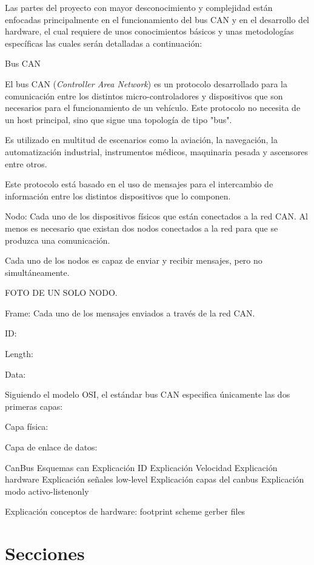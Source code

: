 
Las partes del proyecto con mayor desconocimiento y complejidad están enfocadas principalmente en el funcionamiento del bus CAN y en el desarrollo del hardware, el cual requiere de unos conocimientos básicos y unas metodologías específicas las cuales serán detalladas a continuación:

Bus CAN

El bus CAN (\emph{Controller Area Network}) es un protocolo desarrollado para la comunicación entre los distintos micro-controladores y dispositivos que son necesarios para el funcionamiento de un vehículo. Este protocolo no necesita de un host principal, sino que sigue una topología de tipo "bus".

Es utilizado en multitud de escenarios como la aviación, la navegación, la automatización industrial, instrumentos médicos, maquinaria pesada y ascensores entre otros.

Este protocolo está basado en el uso de mensajes para el intercambio de información entre los distintos dispositivos que lo componen.

Nodo:
Cada uno de los dispositivos físicos que están conectados a la red CAN. Al menos es necesario que existan dos nodos conectados a la red para que se produzca una comunicación.


Cada uno de los nodos es capaz de enviar y recibir mensajes, pero no simultáneamente. 

FOTO DE UN SOLO NODO.

Frame:
Cada uno de los mensajes enviados a través de la red CAN. 

ID:

Length:

Data:



Siguiendo el modelo OSI, el estándar bus CAN especifica únicamente las dos primeras capas:

Capa física:

Capa de enlace de datos:


CanBus
Esquemas can
Explicación ID
Explicación Velocidad
Explicación hardware
Explicación señales low-level
Explicación capas del canbus
Explicación modo activo-listenonly

Explicación conceptos de hardware:
footprint
scheme
gerber files


\section{Secciones}

